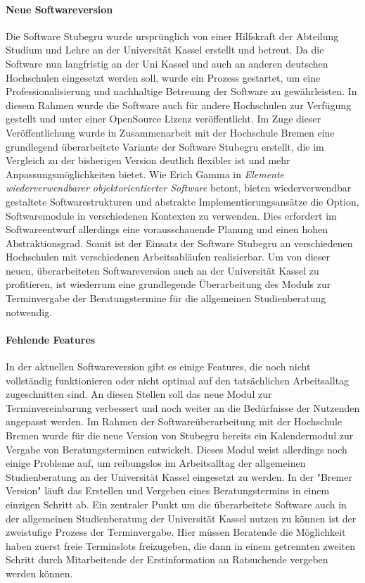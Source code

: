 \documentclass[12pt]{article}
\begin{document}
\paragraph{Neue Softwareversion}
Die Software Stubegru wurde ursprünglich von einer Hilfskraft der Abteilung
Studium und Lehre an der Universität Kassel erstellt und betreut. Da die
Software nun langfristig an der Uni Kassel und auch an anderen deutschen
Hochschulen eingesetzt werden soll, wurde ein Prozess gestartet, um eine
Professionalisierung und nachhaltige Betreuung der Software zu gewährleisten.
In diesem Rahmen wurde die Software auch für andere Hochschulen zur Verfügung
gestellt und unter einer OpenSource Lizenz veröffentlicht. Im Zuge dieser
Veröffentlichung wurde in Zusammenarbeit mit der Hochschule Bremen eine
grundlegend überarbeitete Variante der Software Stubegru erstellt, die im
Vergleich zu der bisherigen Version deutlich flexibler ist und mehr
Anpassungsmöglichkeiten bietet. Wie Erich Gamma in \textit{Elemente
    wiederverwendbarer objektorientierter Software} betont, bieten wiederverwendbar
gestaltete Softwarestrukturen und abstrakte Implementierungsansätze die Option,
Softwaremodule in verschiedenen Kontexten zu verwenden. Dies erfordert im
Softwareentwurf allerdings eine vorausschauende Planung und einen hohen
Abstraktionsgrad.\cite{wiederverwSoftware} Somit ist der Einsatz der Software
Stubegru an verschiedenen Hochschulen mit verschiedenen Arbeitsabläufen
realisierbar. Um von dieser neuen, überarbeiteten Softwareversion auch an der
Universität Kassel zu profitieren, ist wiederrum eine grundlegende
Überarbeitung des Moduls zur Terminvergabe der Beratungstermine für die
allgemeinen Studienberatung notwendig.

\paragraph{Fehlende Features}
In der aktuellen Softwareversion gibt es einige Features, die noch nicht
vollständig funktionieren oder nicht optimal auf den tatsächlichen
Arbeitsalltag zugeschnitten sind. An diesen Stellen soll das neue Modul zur
Terminvereinbarung verbessert und noch weiter an die Bedürfnisse der Nutzenden
angepasst werden. Im Rahmen der Softwareüberarbeitung mit der Hochschule Bremen
wurde für die neue Version von Stubegru bereits ein Kalendermodul zur Vergabe
von Beratungsterminen entwickelt. Dieses Modul weist allerdings noch einige
Probleme auf, um reibungslos im Arbeitsalltag der allgemeinen Studienberatung
an der Universität Kassel eingesetzt zu werden. In der "Bremer Version" läuft
das Erstellen und Vergeben eines Beratungstermins in einem einzigen Schritt ab.
Ein zentraler Punkt um die überarbeitete Software auch in der allgemeinen
Studienberatung der Universität Kassel nutzen zu können ist der zweistufige
Prozess der Terminvergabe. Hier müssen Beratende die Möglichkeit haben zuerst
freie Terminslots freizugeben, die dann in einem getrennten zweiten Schritt
durch Mitarbeitende der Erstinformation an Ratsuchende vergeben werden können.
\end{document}
